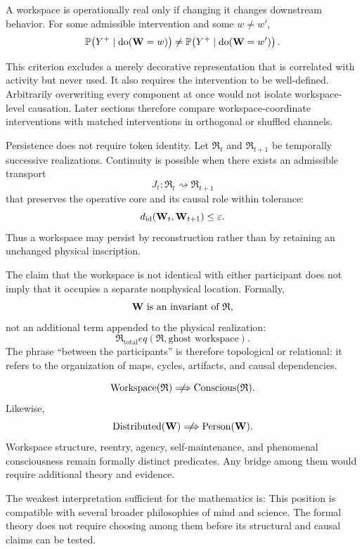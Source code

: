 
A workspace is operationally real only if changing it changes downstream
behavior. For some admissible intervention and some \(w\neq w'\),
\[
\mathbb P\!\left(
Y^+\mid\operatorname{do}(\mathbf W=w)
\right)
\neq
\mathbb P\!\left(
Y^+\mid\operatorname{do}(\mathbf W=w')
\right).
\]

This criterion excludes a merely decorative representation that is correlated
with activity but never used. It also requires the intervention to be
well-defined. Arbitrarily overwriting every component at once would not
isolate workspace-level causation. Later sections therefore compare
workspace-coordinate interventions with matched interventions in orthogonal
or shuffled channels.


Persistence does not require token identity. Let \(\mathfrak R_t\) and
\(\mathfrak R_{t+1}\) be temporally successive realizations. Continuity is
possible when there exists an admissible transport
\[
J_t:\mathfrak R_t\rightsquigarrow\mathfrak R_{t+1}
\]
that preserves the operative core and its causal role within tolerance:
\[
d_{\mathrm{id}}(\mathbf W_t,\mathbf W_{t+1})\leq\varepsilon.
\]
Thus a workspace may persist by reconstruction rather than by retaining an
unchanged physical inscription.


The claim that the workspace is not identical with either participant does
not imply that it occupies a separate nonphysical location. Formally,
\[
\mathbf W
\text{ is an invariant of }\mathfrak R,
\]
not an additional term appended to the physical realization:
\[
\mathfrak R_{\mathrm{total}}
eq(\mathfrak R,\text{ghost workspace}).
\]
The phrase ``between the participants'' is therefore topological or
relational: it refers to the organization of maps, cycles, artifacts, and
causal dependencies.


\[
\operatorname{Workspace}(\mathfrak R)
\centernot\Longrightarrow
\operatorname{Conscious}(\mathfrak R).
\]
Likewise,
\[
\operatorname{Distributed}(\Workspace)
\centernot\Longrightarrow
\operatorname{Person}(\Workspace).
\]
Workspace structure, reentry, agency, self-maintenance, and phenomenal
consciousness remain formally distinct predicates. Any bridge among them
would require additional theory and evidence.


The weakest interpretation sufficient for the mathematics is:
This position is compatible with several broader philosophies of mind and
science. The formal theory does not require choosing among them before its
structural and causal claims can be tested.

